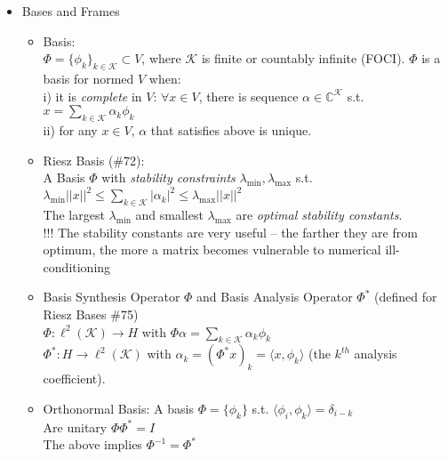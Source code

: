 \documentclass{article}
\newcommand{\la}{\langle}
\newcommand{\ra}{\rangle}
\begin{document}
\begin{itemize}
\begin{itemize}
{	$x=x_S+x_T$, where $x_S\in S, x_T\in T$
	}
	\item Decomposition: $S$ and $T$ form a \textit{decomposition} of $V$, and $x_S,x_T$ the \textit{decomposition} of $x$.
	\item Orthogonal Random Vectors: RVs $x,y$ are \textit{orthogonal} when $\mathbb{E}[xy^{*}]=\mathbf{0}$. (not inner product).
	\end{itemize}
	\item Bases and Frames
	\begin{itemize}
		\item Basis: \\
		{\footnotesize\color{gray}
		$\Phi = \{\phi_k\}_{k\in\mathcal{K}} \subset V$, where $\mathcal{K}$ is finite or countably infinite (FOCI). $\Phi$ is a basis for normed $V$ when: \\
			i) it is \textit{complete} in $V$: $\forall x \in V$, there is sequence $\alpha \in \mathbb{C}^{\mathcal{K}}$ s.t. $x=\sum_{k\in\mathcal{K}}\alpha_k \phi_k$ \\
			ii) for any $x\in V$, $\alpha$ that satisfies above is unique.
		}
	\item Riesz Basis (\#72): \\
	{\color{gray} A Basis $\Phi$ with \textit{stability constraints} $\lambda_{\min}, \lambda_{\max}$ s.t. $\lambda_{\min}||x||^2 \le \sum_{k\in\mathcal{K}}|\alpha_k|^2\le \lambda_{\max}||x||^2$ \\
	The largest $\lambda_{\min}$ and smallest $\lambda_{\max}$ are \textit{optimal stability constants}. \\
	!!! The stability constants are very useful -- the farther they are from optimum, the more a matrix becomes vulnerable to numerical ill-conditioning
	}
	\item Basis Synthesis Operator $\Phi$ and Basis Analysis Operator $\Phi^{*}$ (defined for Riesz Bases \#75)\\
	{\footnotesize\color{gray} $\Phi: \ell^2(\mathcal{K})\rightarrow H$ with $\Phi\alpha = \sum_{k\in\mathcal{K}}\alpha_k\phi_k$ \\
	\footnotesize\color{gray} $\Phi^{*}: H \rightarrow \ell^2(\mathcal{K})$ with $\alpha_k = (\Phi^{*}x)_k = \la x, \phi_k \ra$ (the $k^{th}$ analysis coefficient).
 	}
 	\item Orthonormal Basis: A basis $\Phi=\{\phi_k\}$ s.t. $\la \phi_i, \phi_k \ra = \delta_{i-k}$ \\ 
 	{\footnotesize\color{gray} Are unitary $\Phi\Phi^{*}=I$ \\
 	The above implies $\Phi^{-1}=\Phi^{*}$}

\end{itemize}
\end{itemize}
\end{document}
